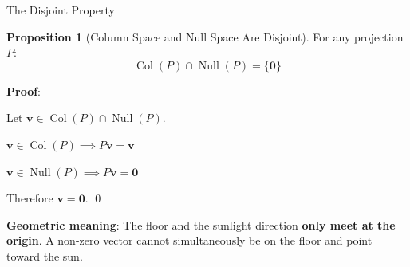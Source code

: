 \documentclass[10pt]{beamer}
\theoremstyle{definition}
\newtheorem{prop}{Proposition}[section]
\newcommand{\x}[1]{\alert{\textbf{#1}}}
\begin{document}
\begin{frame}{The Disjoint Property}

\begin{prop}[Column Space and Null Space Are Disjoint]
For any projection $P$:
$$\operatorname{Col}(P) \cap \operatorname{Null}(P) = \{\mathbf{0}\}$$
\end{prop}

\textbf{Proof}:

Let $\mathbf{v} \in \operatorname{Col}(P) \cap \operatorname{Null}(P)$.

\vspace{0.3em}

$\mathbf{v} \in \operatorname{Col}(P) \implies P\mathbf{v} = \mathbf{v}$

$\mathbf{v} \in \operatorname{Null}(P) \implies P\mathbf{v} = \mathbf{0}$

\vspace{0.3em}

Therefore $\mathbf{v} = \mathbf{0}$. \qed

\vspace{0.5em}

\x{Geometric meaning}: The floor and the sunlight direction \x{only meet at the origin}. A non-zero vector cannot simultaneously be on the floor and point toward the sun.

\end{frame}
\end{document}
